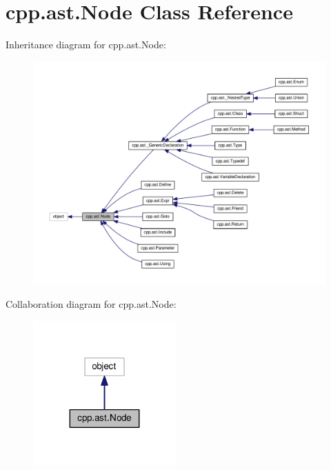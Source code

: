 \hypertarget{classcpp_1_1ast_1_1Node}{}\section{cpp.\+ast.\+Node Class Reference}
\label{classcpp_1_1ast_1_1Node}


Inheritance diagram for cpp.\+ast.\+Node\+:\nopagebreak
\begin{figure}[H]
\begin{center}
\leavevmode
\includegraphics[width=350pt]{classcpp_1_1ast_1_1Node__inherit__graph}
\end{center}
\end{figure}


Collaboration diagram for cpp.\+ast.\+Node\+:\nopagebreak
\begin{figure}[H]
\begin{center}
\leavevmode
\includegraphics[width=155pt]{classcpp_1_1ast_1_1Node__coll__graph}
\end{center}
\end{figure}
